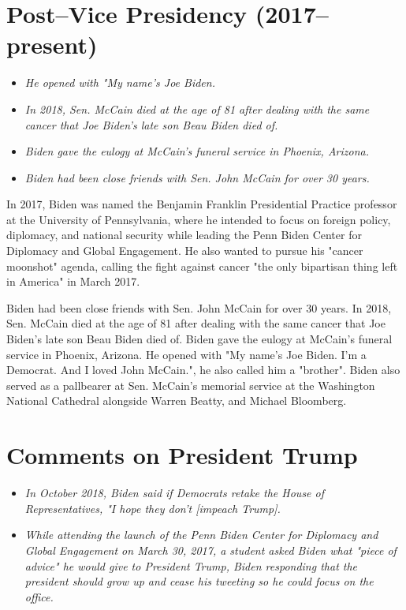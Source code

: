 \section{Post--Vice Presidency
(2017--present)}\label{postvice-presidency-2017present}

\begin{itemize}
\item
  \emph{He opened with "My name's Joe Biden.}
\item
  \emph{In 2018, Sen. McCain died at the age of 81 after dealing with
  the same cancer that Joe Biden's late son Beau Biden died of.}
\item
  \emph{Biden gave the eulogy at McCain's funeral service in Phoenix,
  Arizona.}
\item
  \emph{Biden had been close friends with Sen. John McCain for over 30
  years.}
\end{itemize}

In 2017, Biden was named the Benjamin Franklin Presidential Practice
professor at the University of Pennsylvania, where he intended to focus
on foreign policy, diplomacy, and national security while leading the
Penn Biden Center for Diplomacy and Global Engagement. He also wanted to
pursue his "cancer moonshot" agenda, calling the fight against cancer
"the only bipartisan thing left in America" in March 2017.

Biden had been close friends with Sen. John McCain for over 30 years. In
2018, Sen. McCain died at the age of 81 after dealing with the same
cancer that Joe Biden's late son Beau Biden died of. Biden gave the
eulogy at McCain's funeral service in Phoenix, Arizona. He opened with
"My name's Joe Biden. I'm a Democrat. And I loved John McCain.", he also
called him a "brother". Biden also served as a pallbearer at Sen.
McCain's memorial service at the Washington National Cathedral alongside
Warren Beatty, and Michael Bloomberg.

\section{Comments on President Trump}\label{comments-on-president-trump}

\begin{itemize}
\item
  \emph{In October 2018, Biden said if Democrats retake the House of
  Representatives, "I hope they don't {[}impeach Trump{]}.}
\item
  \emph{While attending the launch of the Penn Biden Center for
  Diplomacy and Global Engagement on March 30, 2017, a student asked
  Biden what "piece of advice" he would give to President Trump, Biden
  responding that the president should grow up and cease his tweeting so
  he could focus on the office.}
\end{itemize}


